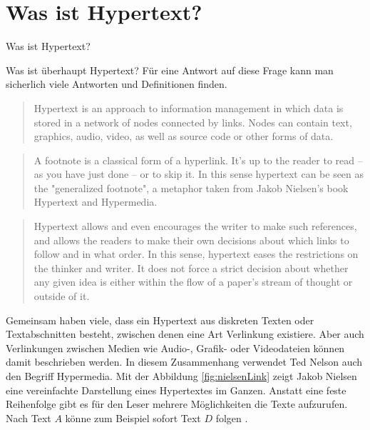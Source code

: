 \chapter{Was ist Hypertext?}
\label{ch:Was ist Hypertext?}

\begin{section}{Was ist Hypertext?}
\label{sec:big_brother}

Was ist überhaupt Hypertext? Für eine Antwort auf diese Frage kann man sicherlich viele Antworten und Definitionen finden.

\begin{quote}
    \glqq [...] Hypertext is an approach to information management in which data is stored in a network of nodes connected by links. Nodes can contain text, graphics, audio, video, as well as source code or other forms of data.\grqq{ }\cite{Smith1988}
\end{quote}

\begin{quote}
    \glqq A footnote is a classical form of a hyperlink. It’s up to the reader to read – as you have just done – or to skip it. In this sense hypertext can be seen as the "generalized footnote", a metaphor taken from Jakob Nielsen’s book Hypertext and Hypermedia.\grqq{ }\cite{Nielsen1990}
\end{quote}

\begin{quote}
\glqq Hypertext allows and even encourages the writer to make such references, and allows the readers to make their own decisions about which links to follow and in what order. In this sense, hypertext eases the restrictions on the thinker and writer. It does not force a strict decision about whether any given idea is either within the flow of a paper's stream of thought or outside of it.\grqq{ }\cite[S.33]{Conklin1987}
\end{quote}
 
Gemeinsam haben viele, dass ein Hypertext aus diskreten Texten oder Textabschnitten besteht, zwischen denen eine Art Verlinkung existiere. Aber auch Verlinkungen zwischen Medien wie Audio-, Grafik- oder Videodateien können damit beschrieben werden. In diesem Zusammenhang verwendet Ted Nelson auch den Begriff \glqq Hypermedia\grqq{ }\cite{Nelson1965}. Mit der Abbildung \ref{fig:nielsenLink} zeigt Jakob Nielsen eine vereinfachte Darstellung eines Hypertextes im Ganzen. Anstatt eine feste Reihenfolge gibt es für den Leser mehrere Möglichkeiten die Texte aufzurufen. Nach Text $A$ könne zum Beispiel sofort Text $D$ folgen \cite[S.1]{Nielsen1995}. 


\end{section}
